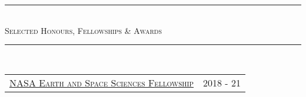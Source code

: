 \documentclass[10pt]{article}
\begin{document}



\vspace{-0.5em}



\begin{center}
{\noindent\rule[0.5ex]{\linewidth}{0.5pt}\\
\vspace{-0.5em}\large{\textsc{Selected Honours, Fellowships \& Awards}}\\
\vspace{-0.25em}
\noindent\rule[0.5ex]{\linewidth}{0.5pt}}\\
\end{center}

\vspace{-0.85em}
\begin{tabular}{p{15cm} p{4cm}}
\href{http://clasp.engin.umich.edu/articles/view/890#.Ww3ySUgvw2x}{\textsc{\normalsize{NASA Earth and Space Sciences Fellowship}}} & \normalsize{2018 - 21}
\end{tabular}
\end{document}
